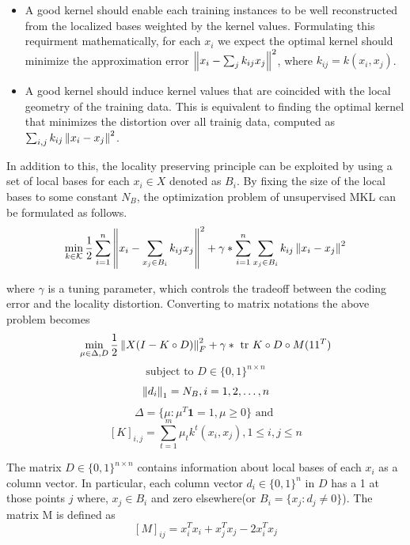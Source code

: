 \begin{itemize}
\item A  good kernel should enable each training instances to be well reconstructed from the localized bases weighted by the kernel values. Formulating this requirment mathematically, for each $x_i$ we expect the optimal kernel should minimize the approximation error $\left\lVert x_i-\sum_j k_{ij}x_j\right\rVert^2$, where $k_{ij} = k(x_i, x_j)$.
\item A good kernel should induce kernel values that are coincided with the local geometry of the training data. This is equivalent to finding the optimal kernel that minimizes the distortion over all trainig data, computed as $\sum_{i,j}k_{ij} \left\lVert x_i-x_j\right\rVert^2 $.
\end{itemize}

In addition to this, the locality preserving principle can be exploited  by using a set of local bases for each $x_i \in X$ denoted as $B_i$. By fixing the size of the local bases to some constant $N_B$,  the optimization problem of unsupervised MKL can be formulated as follows.
\[ \min_{k \in \mathcal{K}} \frac{1}{2}\sum_{i=1}^n \left\lVert x_i - \sum_{x_j \in B_i} k_{ij}x_j\right\rVert^2 + \gamma* \sum_{i=1}^n \sum_{x_j \in B_i} k_{ij} \left\lVert x_i-x_j\right\rVert^2 \]

where $\gamma$ is a tuning parameter, which controls the tradeoff between the coding error and the locality distortion. Converting to matrix notations the above problem becomes
\begin{equation}
  \min_{\mu \in \Delta,D} \frac{1}{2} \left\lVert X(I-K \circ D)\right\rVert_F^2 + \gamma* \textrm{ tr }K\circ D\circ M(11^T)
  \label{obj_mat} 
\end{equation}
\[ \textrm{subject to } D \in \{0,1\}^{n \times n} \]
\[  \left\lVert d_i\right\rVert_1 = N_B, i=1,2,\ldots,n \]
\[ \Delta = \Big\{\mu : \mu^T\textbf{1} = 1, \mu \geq 0 \Big\} \textrm{ and } \]
\[ [K]_{i,j} = \sum_{t=1}^m \mu_t k^t(x_i, x_j), 1\leq i,j \leq n \]

The matrix $D \in \{0,1\}^{n \times n}$ contains information about local bases of each $x_i$ as a column vector. In particular, each column vector $d_i \in \{0, 1\}^n $ in $D$ has a 1 at those points $j$ where, $x_j \in B_i$ and zero elsewhere(or $B_i = \{ x_j : d_j \neq 0 \} $). The matrix M is defined as
\[ [M]_{ij} = x_i^Tx_i + x_j^Tx_j - 2x_i^Tx_j \]

